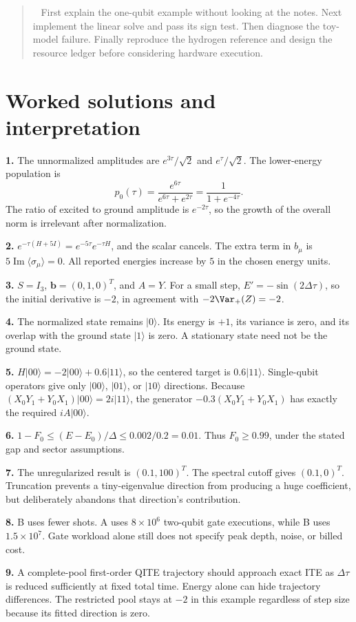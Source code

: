 \documentclass[11pt,a4paper]{article}
\newcommand{\ket}[1]{\lvert #1\rangle}
\newcommand{\ex}[1]{\langle #1\rangle}
\newcommand{\Ima}{\operatorname{Im}}
\newcommand{\dt}{\Delta\tau}
\newcommand{\lesson}[2]{\clearpage\section{#1}\label{#2}}
\newenvironment{idea}[1][Main idea]{\par\smallskip\begin{quotation}\noindent{\bfseries\textcolor{keyblue}{#1.}}\ }{\end{quotation}\smallskip}
\begin{document}
\begin{idea}[A self-study sequence]
First explain the one-qubit example without looking at the notes. Next implement the linear solve and pass its sign test. Then diagnose the toy-model failure. Finally reproduce the hydrogen reference and design the resource ledger before considering hardware execution.
\end{idea}

\lesson{Worked solutions and interpretation}{sec:solutions}
\textbf{1.} The unnormalized amplitudes are $e^{3\tau}/\sqrt2$ and $e^{\tau}/\sqrt2$. The lower-energy population is
\[
p_0(\tau)=\frac{e^{6\tau}}{e^{6\tau}+e^{2\tau}}=\frac{1}{1+e^{-4\tau}}.
\]
The ratio of excited to ground amplitude is $e^{-2\tau}$, so the growth of the overall norm is irrelevant after normalization.

\textbf{2.} $e^{-\tau(H+5I)}=e^{-5\tau}e^{-\tau H}$, and the scalar cancels. The extra term in $b_\mu$ is $5\Ima\ex{\sigma_\mu}=0$. All reported energies increase by $5$ in the chosen energy units.

\textbf{3.} $S=I_3$, $\bm b=(0,1,0)^T$, and $A=Y$. For a small step, $E'=-\sin(2\dt)$, so the initial derivative is $-2$, in agreement with $-2\Var_+(Z)=-2$.

\textbf{4.} The normalized state remains $\ket{0}$. Its energy is $+1$, its variance is zero, and its overlap with the ground state $\ket{1}$ is zero. A stationary state need not be the ground state.

\textbf{5.} $H\ket{00}=-2\ket{00}+0.6\ket{11}$, so the centered target is $0.6\ket{11}$. Single-qubit operators give only $\ket{00}$, $\ket{01}$, or $\ket{10}$ directions. Because $(X_0Y_1+Y_0X_1)\ket{00}=2i\ket{11}$, the generator $-0.3(X_0Y_1+Y_0X_1)$ has exactly the required $iA\ket{00}$.

\textbf{6.} $1-F_0\le(E-E_0)/\Delta\le0.002/0.2=0.01$. Thus $F_0\ge0.99$, under the stated gap and sector assumptions.

\textbf{7.} The unregularized result is $(0.1,100)^T$. The spectral cutoff gives $(0.1,0)^T$. Truncation prevents a tiny-eigenvalue direction from producing a huge coefficient, but deliberately abandons that direction's contribution.

\textbf{8.} B uses fewer shots. A uses $8\times10^6$ two-qubit gate executions, while B uses $1.5\times10^7$. Gate workload alone still does not specify peak depth, noise, or billed cost.

\textbf{9.} A complete-pool first-order QITE trajectory should approach exact ITE as $\dt$ is reduced sufficiently at fixed total time. Energy alone can hide trajectory differences. The restricted pool stays at $-2$ in this example regardless of step size because its fitted direction is zero.
\end{document}
